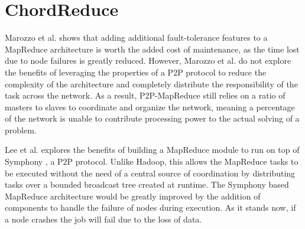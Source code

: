 \documentclass[10pt, conference, compsocconf]{IEEEtran}
\begin{document}






\section{ChordReduce}
Marozzo et al. \cite{marozzo2012p2p} shows that adding additional fault-tolerance features to a MapReduce architecture is worth the added cost of maintenance, as the time lost due to node failures is greatly reduced.  However, Marozzo et al. do not explore the benefits of leveraging the properties of a P2P protocol to reduce the complexity of the architecture and completely distribute the responsibility of the task across the network.  As a result, P2P-MapReduce still relies on a ratio of masters to slaves to coordinate and organize the network, meaning a percentage of the network is unable to contribute processing power to the actual solving of a problem.   

Lee et al. \cite{leemap} explores the benefits of building a MapReduce module to run on top of Symphony \cite{symphony},  a P2P protocol.  Unlike Hadoop, this allows the MapReduce tasks to be executed without the need of a central source of coordination by distributing tasks over a bounded broadcast tree created at runtime.  The Symphony based MapReduce architecture would be greatly improved by the addition of components to handle the failure of nodes during execution.  As it stands now, if a node crashes the job will fail due to the loss of data.
\end{document}
